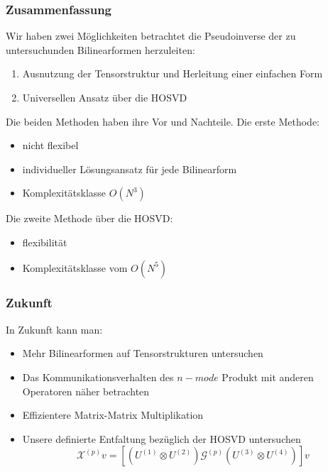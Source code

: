 \begin{frame}
\frametitle{Zusammenfassung}
Wir haben zwei Möglichkeiten betrachtet die Pseudoinverse der zu untersuchunden Bilinearformen herzuleiten:
\begin{enumerate}
\item Ausnutzung der Tensorstruktur und Herleitung einer einfachen Form
\item Universellen Ansatz über die HOSVD
\end{enumerate}
Die beiden Methoden haben ihre Vor und Nachteile. Die erste Methode:
\begin{itemize}
\item nicht flexibel
\item individueller Lösungsansatz für jede Bilinearform
\item Komplexitätsklasse $O(N^3)$
\end{itemize}
Die zweite Methode über die HOSVD:
\begin{itemize}
\item flexibilität
\item Komplexitätsklasse vom $O(N^5)$
\end{itemize}
\end{frame}
\begin{frame}
\frametitle{Zukunft}
In Zukunft kann man:
\begin{itemize}
\item Mehr Bilinearformen auf Tensorstrukturen untersuchen
\item Das Kommunikationsverhalten des $n-mode$ Produkt  mit anderen Operatoren näher betrachten
\item Effizientere Matrix-Matrix Multiplikation
\item Unsere definierte Entfaltung bezüglich der HOSVD untersuchen
\begin{equation*}
\mathcal{X}^{(p)} v = [(U^{(1)} \otimes U^{(2)}) \mathcal{G}^{(p)} (U^{(3)} \otimes U^{(4)})] v
\end{equation*}
\end{itemize}
\end{frame}